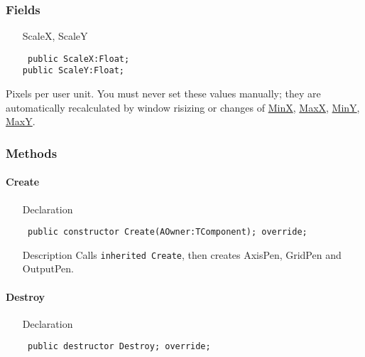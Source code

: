 \documentclass[12pt,a4paper,oneside]{report}
\newcommand{\declarationitem}[1]{{\addfontfeatures{FakeSlant} #1}}
\newcommand{\descriptiontitle}[1]{{\addfontfeatures{FakeSlant}#1}}
\newcommand{\inlineitem}[1]{{\addfontfeatures{FakeBold} #1}}
\newcommand{\code}[1]{\texttt{#1}}
\begin{document}
\subsubsection{Fields}
\begin{itemize}\label{lmcoordsys.TCoordSys-ScaleX}
\item[\inlineitem{ScaleX, ScaleY}\hfill]
\begin{flushleft}
\code{
public ScaleX:Float;\\
public ScaleY:Float;}
\end{flushleft}
\end{itemize}
\par Pixels per user unit. You must never set these values manually; they are automatically recalculated by window risizing or changes of \hyperref[lmcoordsys.TCoordSys-MinX]{MinX}, \hyperref[lmcoordsys.TCoordSys-MinX]{MaxX}, \hyperref[lmcoordsys.TCoordSys-MinY]{MinY}, \hyperref[lmcoordsys.TCoordSys-MinY]{MaxY}. \label{lmcoordsys.TCoordSys-ScaleY}

\subsubsection{Methods}
\paragraph{Create}\hspace*{\fill}
\label{lmcoordsys.TCoordSys-Create}
\begin{itemize}\item[\declarationitem{Declaration}\hfill]
\begin{flushleft}
\code{
public constructor Create(AOwner:TComponent); override;}
\end{flushleft}
\item[\descriptiontitle{Description}] Calls \code{inherited Create}, then creates AxisPen, GridPen and OutputPen. 
\end{itemize}
\paragraph{Destroy}\hspace*{\fill}
\label{lmcoordsys.TCoordSys-Destroy}
\begin{itemize}\item[\declarationitem{Declaration}\hfill]
\begin{flushleft}
\code{
public destructor Destroy; override;}
\end{flushleft}
\end{itemize}
\end{document}

